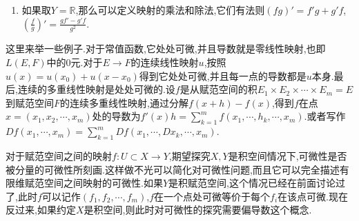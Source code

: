 \begin{enumerate}
\begin{proof}
		映射$s\mapsto f(x_0+s)-f(x_0)$是从$E$的0元的某个开邻域$V$到$F$的0元的某个开邻域$W$的同胚,并且具有逆连续映射$z:t\mapsto g(y_0+t)-g(y_0)$.按照条件,$f'(x_0)$具有连续的逆映射$u$.于是存在$c>0$使得$\|u(t)\|\le c\|t\|,\forall t\in F$.
		
		现在对任意的$\varepsilon>0$,不妨设$\varepsilon\le\frac{1}{2c}$,那么存在$r>0$使得,如果记$f(x_0+s)-f(x_0)=f'(x_0)s+o_1(s)$,从$\|s\|\le r$可以推出$\|o_1(s)\|\le\varepsilon\|s\|$.现在取足够小的正数$r'$使得$\|t\|\le r'$包含在$W$中,并且这个闭球在$t\mapsto g(y_0+t)-g(y_0)$下的像包含在$\|s\|\le r$中.那么如果$\|t\|\le r'$,就有$t=f(x_0+z)-f(x_0)$,并且由于$\|z\|\le r$,就有$t=f'(x_0)z+o_1(z)$,其中$\|o_1(z)\|\le\varepsilon\|z\|$,于是:
		$$ut=u(f'(x_0)z)+uo_1(z)=z+uo_1(z)$$
		
		注意到$\|uo_1(z)\|\le c\|o_1(z)\|\le c\varepsilon\|z\|\le\frac{\|z\|}{2}$,于是得到$\|ut\|\ge\|z\|-\frac{\|z\|}{2}=\frac{\|z\|}{2}$.于是$\|z\|\le2\|ut\|\le 2c\|t\|$,得到$\|uo_1(z)\|\le c\varepsilon\|z\|\le2c^2\varepsilon\|t\|$.综上证明了存在$r'$使得$\|t\|\le r'$时候推出$\|g(y_0+t)-g(y_0)-ut\|\le2c^2\varepsilon\|t\|$.于是说明$u$是$g$在$y_0$处导数.
		
	\end{proof}
	
	这里强调,如果$f$仅仅作为$A\to B$的可微同胚,甚至不能保证$f'(x_0)$是满射,例如$\mathbb{R}\to\mathbb{R}^3$的映射$x\mapsto x^3$.
	\item 如果取$Y=\mathbb{R}$,那么可以定义映射的乘法和除法,它们有法则$(fg)'=f'g+g'f$,$(\frac{f}{g})'=\frac{gf'-g'f}{g^2}$.
\end{enumerate}

这里来举一些例子.对于常值函数,它处处可微,并且导数就是零线性映射,也即$L(E,F)$中的0元.对于$E\to F$的连续线性映射$u$,按照$u(x)=u(x_0)+u(x-x_0)$得到它处处可微,并且每一点的导数都是$u$本身.最后,连续的多重线性映射是处处可微的.设$f$是从赋范空间的积$E_1\times E_2\times\cdots\times E_m=E$到赋范空间$F$的连续多重线性映射,通过分解$f(x+h)-f(x)$,得到$f$在点$x=(x_1,x_2,\cdots,x_m)$处的导数为$f'(x)h=\sum_{k=1}^{m}f(x_1,\cdots,h_k,\cdots,x_m)$.或者写作$Df(x_1,\cdots,x_m)=\sum_{k=1}^{m}Df(x_1,\cdots,Dx_k,\cdots,x_m)$.

对于赋范空间之间的映射$f:U\subset X\to Y$,期望探究$X,Y$是积空间情况下,可微性是否被分量的可微性所刻画.这样做不光可以简化对可微性问题,而且它可以完全描述有限维赋范空间之间映射的可微性.如果$Y$是积赋范空间,这个情况已经在前面讨论过了,此时$f$可以记作$(f_1,f_2,\cdots,f_m)$,$f$在一个点处可微等价于每个$f_i$在该点可微.现在反过来,如果约定$X$是积空间,则此时对可微性的探究需要偏导数这个概念.

